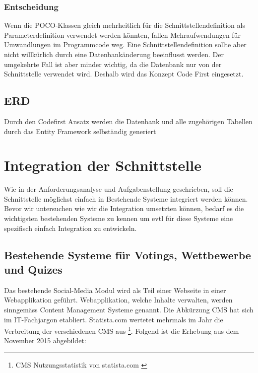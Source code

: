 \subsubsection{Entscheidung}\label{entscheidung}

Wenn die POCO-Klassen gleich mehrheitlich für die
Schnittstellendefinition als Parameterdefinition verwendet werden
könnten, fallen Mehraufwendungen für Umwandlungen im Programmcode weg.
Eine Schnittstellendefinition sollte aber nicht willkürlich durch eine
Datenbankänderung beeinflusst werden. Der umgekehrte Fall ist aber
minder wichtig, da die Datenbank nur von der Schnittstelle verwendet
wird. Deshalb wird das Konzept Code First eingesetzt.

\subsection{ERD}\label{erd}

Durch den Codefirst Ansatz werden die Datenbank und alle zugehörigen
Tabellen durch das Entity Framework selbständig generiert

\newpage

\section{Integration der
Schnittstelle}\label{integration-der-schnittstelle}

Wie in der Anforderungsanalyse und Aufgabenstellung geschrieben, soll
die Schnittstelle möglichst einfach in Bestehende Systeme integriert
werden können. Bevor wir untersuchen wie wir die Integration umsetzten
können, bedarf es die wichtigsten bestehenden Systeme zu kennen um evtl
für diese Systeme eine spezifisch einfach Integration zu entwickeln.

\subsection{Bestehende Systeme für Votings, Wettbewerbe und
Quizes}\label{bestehende-systeme-fuxfcr-votings-wettbewerbe-und-quizes}

Das bestehende Social-Media Modul wird als Teil einer Webseite in einer
Webapplikation geführt. Webapplikation, welche Inhalte verwalten, werden
sinngemäss Content Management Systeme genannt. Die Abkürzung CMS hat
sich im IT-Fachjargon etabliert. Statista.com wertetet mehrmals im Jahr
die Verbreitung der verschiedenen CMS aus \footnote{CMS
  Nutzungsstatistik von statista.com \autocite{statisticinfostatista}}.
Folgend ist die Erhebung aus dem November 2015 abgebildet:

